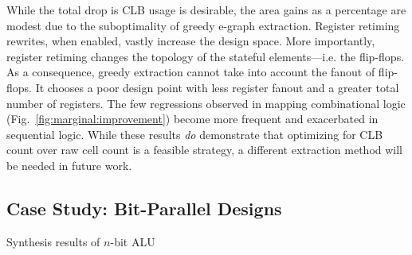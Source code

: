 While the total drop is CLB usage is desirable, the area gains as a percentage
are modest due to the suboptimality of greedy e-graph extraction. Register
retiming rewrites, when enabled, vastly increase the design space. More
importantly, register retiming changes the topology of the stateful
elements---i.e. the flip-flops. As a consequence, greedy extraction cannot take
into account the fanout of flip-flops. It chooses a poor design point with less
register fanout and a greater total number of registers. The few regressions
observed in mapping combinational logic (Fig.~\ref{fig:marginal:improvement})
become more frequent and exacerbated in sequential logic. While these results
\textit{do} demonstrate that optimizing for CLB count over raw cell count is a
feasible strategy, a different extraction method will be needed in future work.

\subsection{Case Study: Bit-Parallel Designs}\label{sec:results:scalability}
\begin{table}
    \centering
    \caption{Synthesis results of $n$-bit ALU}\label{tab:alu}
\end{table}
